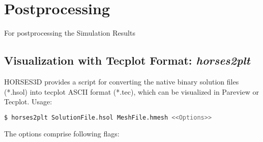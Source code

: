 \documentclass[a4paper,10pt]{report}
\begin{document}
% 






\chapter{Postprocessing}

For postprocessing the Simulation Results

\section{Visualization with Tecplot Format: \textit{horses2plt}}\label{sect.convertTec}

HORSES3D provides a script for converting the native binary solution files (*.hsol) into tecplot ASCII format (*.tec), which can be visualized in Pareview or Tecplot. Usage:

\begin{lstlisting}[language=bash]
	$ horses2plt SolutionFile.hsol MeshFile.hmesh <<Options>>
\end{lstlisting}

The options comprise following flags:
\end{document}
